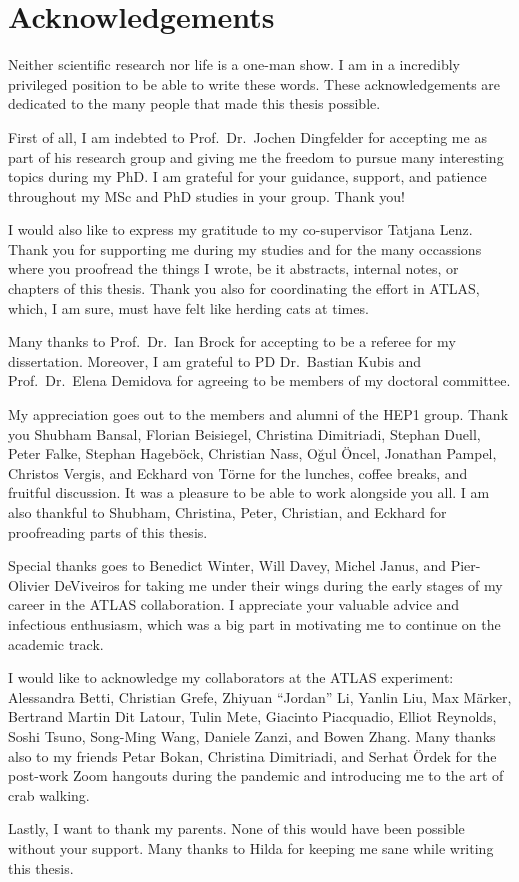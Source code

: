 \chapter*{Acknowledgements}

Neither scientific research nor life is a one-man show. I am in a incredibly
privileged position to be able to write these words. These acknowledgements are
dedicated to the many people that made this thesis possible.

First of all, I am indebted to Prof.\ Dr.\ Jochen Dingfelder for accepting me as
part of his research group and giving me the freedom to pursue many interesting
topics during my PhD. I am grateful for your guidance, support, and patience
throughout my MSc and PhD studies in your group. Thank you!

I would also like to express my gratitude to my co-supervisor Tatjana
Lenz. Thank you for supporting me during my studies and for the many occassions
where you proofread the things I wrote, be it abstracts, internal notes, or
chapters of this thesis. Thank you also for coordinating the \bbtautau effort in
ATLAS, which, I am sure, must have felt like herding cats at times.

Many thanks to Prof.\ Dr.\ Ian Brock for accepting to be a referee for my
dissertation. Moreover, I am grateful to PD Dr.\ Bastian Kubis and Prof.\ Dr.\
Elena Demidova for agreeing to be members of my doctoral committee.

My appreciation goes out to the members and alumni of the \textsc{HEP1}
group. Thank you Shubham Bansal, Florian Beisiegel, Christina Dimitriadi,
Stephan Duell, Peter Falke, Stephan Hageböck, Christian Nass, Oğul Öncel,
Jonathan Pampel, Christos Vergis, and Eckhard von Törne for the lunches, coffee
breaks, and fruitful discussion. It was a pleasure to be able to work alongside
you all. I am also thankful to Shubham, Christina, Peter, Christian, and Eckhard
for proofreading parts of this thesis.

Special thanks goes to Benedict Winter, Will Davey, Michel Janus, and
Pier-Olivier DeViveiros for taking me under their wings during the early stages
of my career in the ATLAS collaboration. I appreciate your valuable advice and
infectious enthusiasm, which was a big part in motivating me to continue on the
academic track.

I would like to acknowledge my collaborators at the ATLAS experiment: Alessandra
Betti, Christian Grefe, Zhiyuan ``Jordan'' Li, Yanlin Liu, Max Märker, Bertrand
Martin Dit Latour, Tulin Mete, Giacinto Piacquadio, Elliot Reynolds, Soshi
Tsuno, Song-Ming Wang, Daniele Zanzi, and Bowen Zhang. Many thanks also to my
\bbtautau friends Petar Bokan, Christina Dimitriadi, and Serhat Ördek for the
post-work Zoom hangouts during the pandemic and introducing me to the art of
crab walking.

Lastly, I want to thank my parents. None of this would have been possible
without your support. Many thanks to Hilda for keeping me sane while writing
this thesis.

